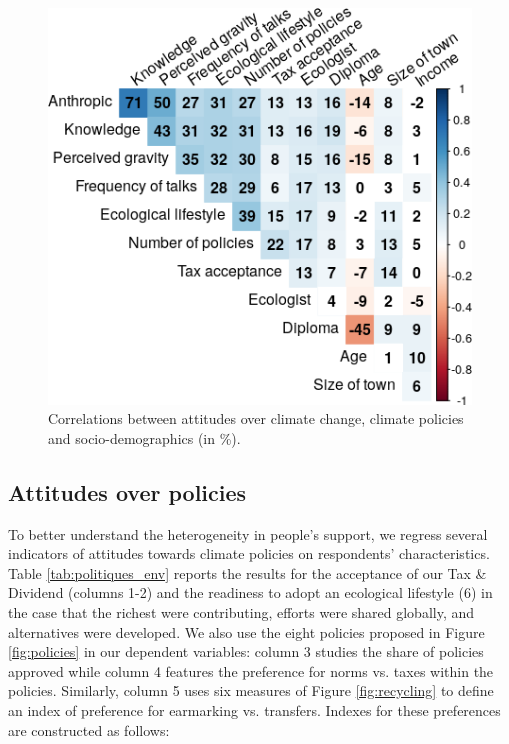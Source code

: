 \documentclass[english,5p,authoryear]{elsarticle}
\begin{document}
\begin{figure}[!htbp]
\centering
\includegraphics[width=0.95\columnwidth]{Images/correlation_matrix.png}
\caption{Correlations between attitudes over climate change, climate policies and socio-demographics (in \%).}
\label{fig:correlations}
\end{figure}

    \subsection{Attitudes over policies}\label{sec:determinants_attitudes_policies}

To better understand the heterogeneity in people's support, we regress several indicators of attitudes towards climate policies on respondents' characteristics. Table \ref{tab:politiques_env} reports the results for the acceptance of our Tax \& Dividend (columns 1-2) and the readiness to adopt an ecological lifestyle (6) in the case that the richest were contributing, efforts were shared globally, and alternatives were developed. We also use the eight policies proposed in Figure \ref{fig:policies} in our dependent variables: column 3 studies the share of policies approved while column 4 features the preference for norms vs. taxes within the policies. Similarly, column 5 uses six measures of Figure \ref{fig:recycling} to define an index of preference for earmarking vs. transfers. Indexes for these preferences are constructed as follows:
\end{document}
